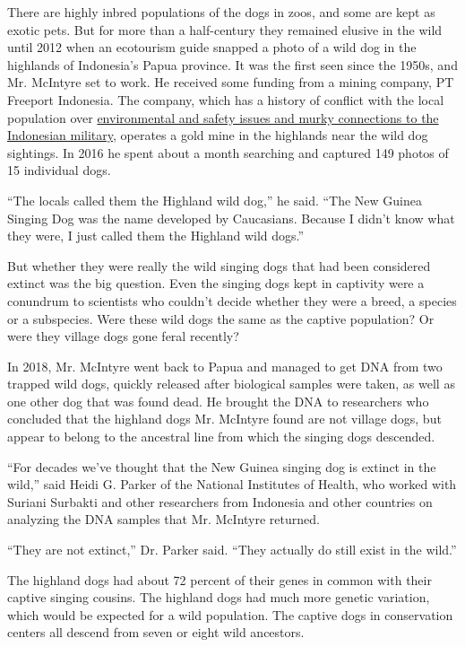 There are highly inbred populations of the dogs in zoos, and some are
kept as exotic pets. But for more than a half-century they remained
elusive in the wild until 2012 when an ecotourism guide snapped a photo
of a wild dog in the highlands of Indonesia's Papua province. It was the
first seen since the 1950s, and Mr. McIntyre set to work. He received
some funding from a mining company, PT Freeport Indonesia. The company,
which has a history of conflict with the local population over
\href{https://www.nytimes3xbfgragh.onion/2005/12/27/world/asia/below-a-mountain-of-wealth-a-river-of-waste.html}{environmental
and safety issues and murky connections to the Indonesian military},
operates a gold mine in the highlands near the wild dog sightings. In
2016 he spent about a month searching and captured 149 photos of 15
individual dogs.

``The locals called them the Highland wild dog,'' he said. ``The New
Guinea Singing Dog was the name developed by Caucasians. Because I
didn't know what they were, I just called them the Highland wild dogs.''

But whether they were really the wild singing dogs that had been
considered extinct was the big question. Even the singing dogs kept in
captivity were a conundrum to scientists who couldn't decide whether
they were a breed, a species or a subspecies. Were these wild dogs the
same as the captive population? Or were they village dogs gone feral
recently?

In 2018, Mr. McIntyre went back to Papua and managed to get DNA from two
trapped wild dogs, quickly released after biological samples were taken,
as well as one other dog that was found dead. He brought the DNA to
researchers who concluded that the highland dogs Mr. McIntyre found are
not village dogs, but appear to belong to the ancestral line from which
the singing dogs descended.

``For decades we've thought that the New Guinea singing dog is extinct
in the wild,'' said Heidi G. Parker of the National Institutes of
Health, who worked with Suriani Surbakti and other researchers from
Indonesia and other countries on analyzing the DNA samples that Mr.
McIntyre returned.

``They are not extinct,'' Dr. Parker said. ``They actually do still
exist in the wild.''

The highland dogs had about 72 percent of their genes in common with
their captive singing cousins. The highland dogs had much more genetic
variation, which would be expected for a wild population. The captive
dogs in conservation centers all descend from seven or eight wild
ancestors.

